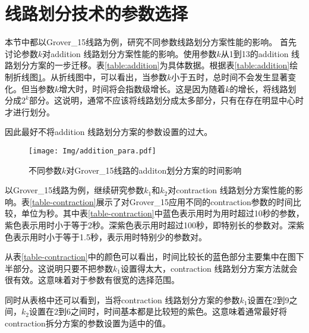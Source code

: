 \section{线路划分技术的参数选择}
\label{sec-para}
本节中都以Grover\_15线路为例，研究不同参数线路划分方案性能的影响。
首先讨论参数$k$对addition 线路划分方案性能的影响。使用参数$k$从1到13的addition 线路划分方案的一步迁移。表\ref{table:addition}为具体数据。根据表\ref{table:addition}绘制折线图\ref{fig:addition-ex}。从折线图中，可以看出，当参数$k$小于五时，总时间不会发生显著变化。但当参数$k$增大时，时间将会指数级增长。这是因为随着$k$的增长，将线路划分成$2^k$部分。这说明，通常不应该将线路划分成太多部分，只有在存在明显中心时才进行划分。

因此最好不将addition 线路划分方案的参数设置的过大。
\begin{figure}
    \centering
    \texttt{[image: Img/addition\_para.pdf]}
    \caption{不同参数$k$对Grover\_15线路的additon划分方案的时间影响}
    \label{fig:addition-ex}
\end{figure}
\begin{table}[htbp]
    \caption{对grover\_15应用不同的addition参数的时间对比}
    \label{table:addition}
    \centering
\end{table}


以Grover\_15线路为例，继续研究参数$k_1$和$k_2$对contraction 线路划分方案性能的影响。表\ref{table-contraction}展示了对Grover\_15应用不同的contraction参数的时间比较，单位为秒。其中表\ref{table-contraction}中蓝色表示用时为用时超过10秒的参数，紫色表示用时小于等于2秒。深紫色表示用时超过100秒，即特别长的参数对。深紫色表示用时小于等于1.5秒，表示用时特别少的参数对。

从表\ref{table-contraction}中的颜色可以看出，时间比较长的蓝色部分主要集中在图下半部分。这说明只要不把参数$k_1$设置得太大，contraction 线路划分方案方法就会很有效。这意味着对于参数有很宽的选择范围。

同时从表格中还可以看到，当将contraction 线路划分方案的参数$k_1$设置在2到9之间，$k_2$设置在2到6之间时，时间基本都是比较短的紫色。这意味着通常最好将contraction拆分方案的参数设置为适中的值。


